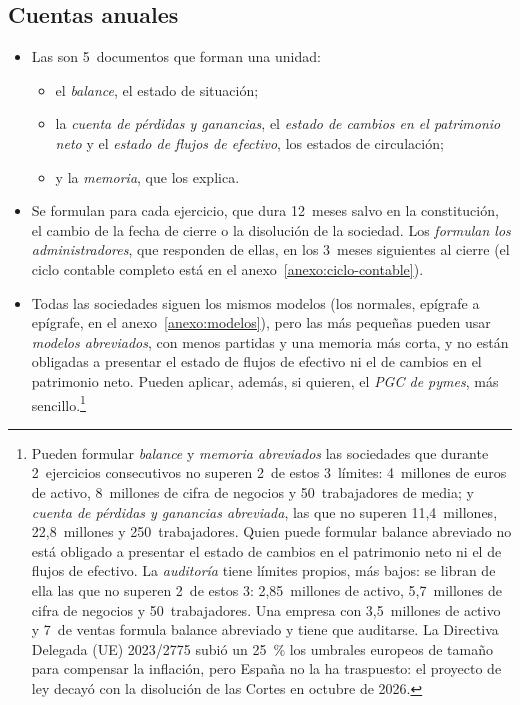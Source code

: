 \documentclass[11pt]{article}
\begin{document}
\subsection{Cuentas anuales}\label{sec:cuentas-anuales}

\begin{itemize}
\item Las  son 5~documentos que forman una unidad\nocite{LSC2010}:
  \begin{itemize}
  \item el \emph{balance}, el estado de situación;
  \item la \emph{cuenta de pérdidas y ganancias}, el \emph{estado de cambios en el patrimonio neto} y el \emph{estado de flujos de efectivo}, los estados de circulación;
  \item y la \emph{memoria}, que los explica.
  \end{itemize}
\item Se formulan para cada ejercicio, que dura 12~meses salvo en la constitución, el cambio de la fecha de cierre o la disolución de la sociedad. Los \emph{formulan los administradores}, que responden de ellas, en los 3~meses siguientes al cierre (el ciclo contable completo está en el anexo~\ref{anexo:ciclo-contable}).
\item Todas las sociedades siguen los mismos modelos (los normales, epígrafe a epígrafe, en el anexo~\ref{anexo:modelos}), pero las más pequeñas pueden usar \emph{modelos abreviados}, con menos partidas y una memoria más corta, y no están obligadas a presentar el estado de flujos de efectivo ni el de cambios en el patrimonio neto. Pueden aplicar, además, si quieren, el \emph{PGC de pymes}, más sencillo\nocite{BOE2007PGCPymes}.\footnote{Pueden formular \emph{balance} y \emph{memoria abreviados} las sociedades que durante 2~ejercicios consecutivos no superen 2~de estos 3~límites: 4~millones de euros de activo, 8~millones de cifra de negocios y 50~trabajadores de media; y \emph{cuenta de pérdidas y ganancias abreviada}, las que no superen 11,4~millones, 22,8~millones y 250~trabajadores. Quien puede formular balance abreviado no está obligado a presentar el estado de cambios en el patrimonio neto ni el de flujos de efectivo\nocite{LSC2010,BOE2007PGC}. La \emph{auditoría} tiene límites propios, más bajos: se libran de ella las que no superen 2~de estos 3: 2,85~millones de activo, 5,7~millones de cifra de negocios y 50~trabajadores. Una empresa con 3,5~millones de activo y 7~de ventas formula balance abreviado y tiene que auditarse. La Directiva Delegada (UE) 2023/2775 subió un 25~\% los umbrales europeos de tamaño para compensar la inflación, pero España no la ha traspuesto: el proyecto de ley decayó con la disolución de las Cortes en octubre de 2026\nocite{UE2023DirectivaDelegada2775,Congreso2026CriteriosTamano}.}
\end{itemize}
\end{document}
